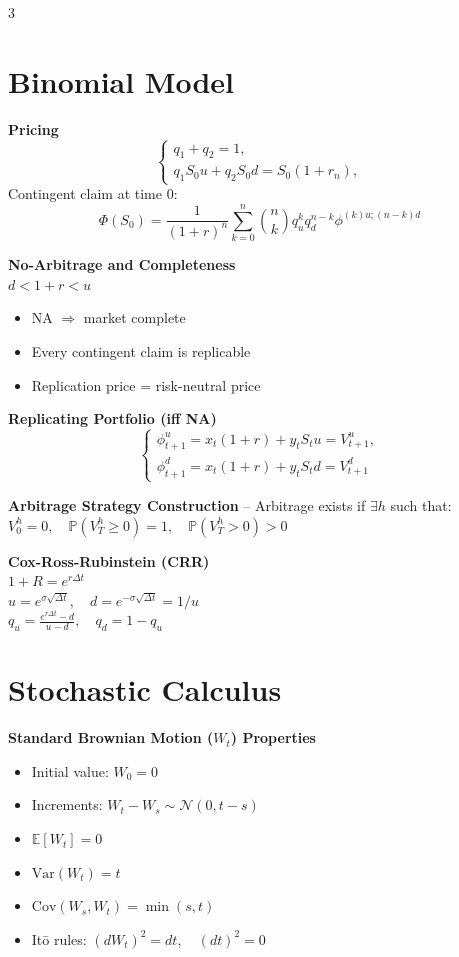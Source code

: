 \documentclass[8pt, a4paper, landscape]{extarticle}
\newcommand{\E}{\mathbb{E}}
\newcommand{\N}{\mathcal{N}}
\begin{document}
\begin{multicols*}{3}

\section*{Binomial Model}
\textbf{Pricing}
\[
\begin{cases}
q_1 + q_2 = 1, \\
q_1 S_0 u + q_2 S_0 d = S_0 (1+r_n),
\end{cases}
\]
Contingent claim at time 0:
\[ \Phi(S_0) = \frac{1}{(1+r)^n} \sum_{k=0}^n \binom{n}{k} q_u^k q_d^{n-k} \phi^{(k) u; (n-k) d} \]

\textbf{No-Arbitrage and Completeness}\\
$d < 1+r < u$
\begin{itemize}
    \item NA $\Rightarrow$ market complete
    \item Every contingent claim is replicable
    \item Replication price = risk-neutral price
\end{itemize}

\textbf{Replicating Portfolio (iff NA)}
\[
\begin{cases}
\phi_{t+1}^u = x_t(1+r) + y_t S_t u = V_{t+1}^u, \\
\phi_{t+1}^d = x_t(1+r) + y_t S_t d = V_{t+1}^d
\end{cases}
\]

\textbf{Arbitrage Strategy Construction} -- Arbitrage exists if $\exists h$ such that:
$V_0^h = 0, \quad \mathbb{P}(V_T^h \ge 0) = 1, \quad \mathbb{P}(V_T^h > 0) > 0$

\textbf{Cox-Ross-Rubinstein (CRR)} \\
$1+R = e^{r \Delta t}$ \\
$u = e^{\sigma \sqrt{\Delta t}}, \quad d = e^{-\sigma \sqrt{\Delta t}} = 1/u$ \\
$q_u = \frac{e^{r \Delta t} - d}{u - d}, \quad q_d = 1 - q_u$
\section*{Stochastic Calculus}
\textbf{Standard Brownian Motion ($W_t$) Properties}
\begin{itemize}
    \item Initial value: $W_0 = 0$
    \item Increments: $W_t - W_s \sim \N(0, t-s)$
    \item $\E[W_t] = 0$
    \item $\text{Var}(W_t) = t$
    \item $\text{Cov}(W_s, W_t) = \min(s, t)$
    \item Itō rules: $(dW_t)^2 = dt, \quad (dt)^2 = 0$
\end{itemize}


\end{multicols*}
\end{document}
